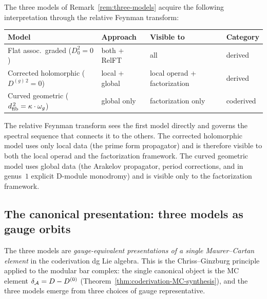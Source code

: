 \begin{remark}
\label{rem:rft-three-models-relation}
The three models of Remark~\ref{rem:three-models} acquire the
following interpretation through the relative Feynman transform:
\renewcommand{\arraystretch}{1.25}
\begin{center}
\begin{tabular}{@{}llll@{}}
\toprule
\textbf{Model} & \textbf{Approach} & \textbf{Visible to} & \textbf{Category} \\
\midrule
Flat assoc.\ graded ($D_0^2 = 0$)
 & both + RelFT
 & all
 & derived \\[3pt]
Corrected holomorphic ($D^{(g)\,2} = 0$)
 & local + global
 & local operad + factorization
 & derived \\[3pt]
Curved geometric ($d_{\mathrm{fib}}^{\,2} = \kappa \cdot \omega_g$)
 & global only
 & factorization only
 & coderived \\
\bottomrule
\end{tabular}
\end{center}
\noindent
The relative Feynman transform sees the first model
directly and governs the spectral sequence that connects it to
the others. The corrected holomorphic model uses only local
data (the prime form propagator) and is therefore visible to
both the local operad and the factorization framework. The
curved geometric model uses global data (the Arakelov propagator,
period corrections, and in genus~$1$ explicit D-module monodromy)
and is visible only to
the factorization framework.
\end{remark}


\subsection{The canonical presentation: three models as gauge orbits}
\label{subsec:gauge-orbit-canonical}

The three models are \emph{gauge-equivalent
presentations of a single Maurer--Cartan element} in the coderivation
dg Lie algebra. This is the Chriss--Ginzburg principle applied to
the modular bar complex: the single canonical object is the MC element
$\delta_{\mathcal{A}} = D - D^{(0)}$
(Theorem~\ref{thm:coderivation-MC-synthesis}), and the three models
emerge from three choices of gauge representative.

